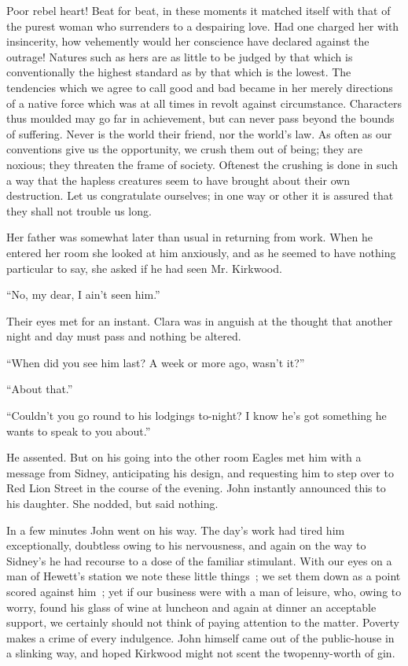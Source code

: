 Poor rebel heart! Beat for beat, in these moments it matched itself with
that of the purest woman who surrenders to a despairing love. Had one
charged her with insincerity, how vehemently would her conscience have
declared against the outrage! Natures such as hers are as little to be
judged by that which is conventionally the highest standard as by that
which is the lowest. The tendencies which we agree to call good and bad
became {\protect\hypertarget{105}{}{}}in her merely directions of a
native force which was at all times in revolt against circumstance.
Characters thus moulded may go far in achievement, but can never pass
beyond the bounds of suffering. Never is the world their friend, nor the
world's law. As often as our conventions give us the opportunity, we
crush them out of being; they are noxious; they threaten the frame of
society. Oftenest the crushing is done in such a way that the hapless
creatures seem to have brought about their own destruction. Let us
congratulate ourselves; in one way or other it is assured that they
shall not trouble us long.

Her father was somewhat later than usual in returning from work. When he
entered her room she looked at him anxiously, and as he seemed to have
nothing particular to say, she asked if he had seen Mr. Kirkwood.

``No, my dear, I ain't seen him.''

Their eyes met for an instant. Clara was in anguish at the thought that
another night and day must pass and nothing be altered.

``When did you see him last? A week or more ago, wasn't it?''

``About that.''

{\protect\hypertarget{106}{}{}} ``Couldn't you go round to his lodgings
to-night? I know he's got something he wants to speak to you about.''

He assented. But on his going into the other room Eagles met him with a
message from Sidney, anticipating his design, and requesting him to step
over to Red Lion Street in the course of the evening. John instantly
announced this to his daughter. She nodded, but said nothing.

In a few minutes John went on his way. The day's work had tired him
exceptionally, doubtless owing to his nervousness, and again on the way
to Sidney's he had recourse to a dose of the familiar stimulant. With
our eyes on a man of Hewett's station we note these little things~; we
set them down as a point scored against him~; yet if our business were
with a man of leisure, who, owing to worry, found his glass of wine at
luncheon and again at dinner an acceptable support, we certainly should
not think of paying attention to the matter. Poverty makes a crime of
every indulgence. John himself came out of the public-house in a
slinking way, and hoped Kirkwood might not scent the twopenny-worth of
gin.

